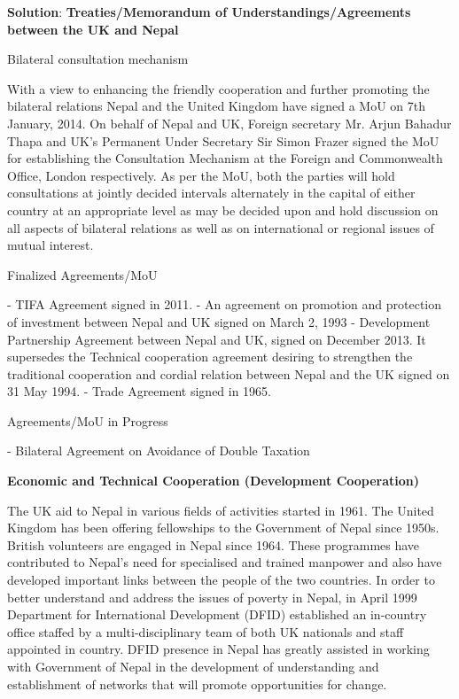 \documentclass[
  openany]{book}
\newenvironment{solution}{ {\bfseries Solution}:}{}
\begin{document}
\begin{solution}
\textbf{Treaties/Memorandum of Understandings/Agreements between the UK and Nepal}

Bilateral consultation mechanism

With a view to enhancing the friendly cooperation and further promoting the bilateral relations Nepal and the United Kingdom have signed a MoU on 7th January, 2014. On behalf of Nepal and UK, Foreign secretary Mr. Arjun Bahadur Thapa and UK's Permanent Under Secretary Sir Simon Frazer signed the MoU for establishing the Consultation Mechanism at the Foreign and Commonwealth Office, London respectively. As per the MoU, both the parties will hold consultations at jointly decided intervals alternately in the capital of either country at an appropriate level as may be decided upon and hold discussion on all aspects of bilateral relations as well as on international or regional issues of mutual interest.

Finalized Agreements/MoU

- TIFA Agreement signed in 2011.
- An agreement on promotion and protection of investment between Nepal and UK signed on March 2, 1993
- Development Partnership Agreement between Nepal and UK, signed on December 2013. It supersedes the Technical cooperation agreement desiring to strengthen the traditional cooperation and cordial relation between Nepal and the UK signed on 31 May 1994.
- Trade Agreement signed in 1965.

Agreements/MoU in Progress

- Bilateral Agreement on Avoidance of Double Taxation

\textbf{Economic and Technical Cooperation (Development Cooperation)}

The UK aid to Nepal in various fields of activities started in 1961. The United Kingdom has been offering fellowships to the Government of Nepal since 1950s. British volunteers are engaged in Nepal since 1964. These programmes have contributed to Nepal's need for specialised and trained manpower and also have developed important links between the people of the two countries. In order to better understand and address the issues of poverty in Nepal, in April 1999 Department for International Development (DFID) established an in-country office staffed by a multi-disciplinary team of both UK nationals and staff appointed in country. DFID presence in Nepal has greatly assisted in working with Government of Nepal in the development of understanding and establishment of networks that will promote opportunities for change.


\end{solution}
\end{document}
